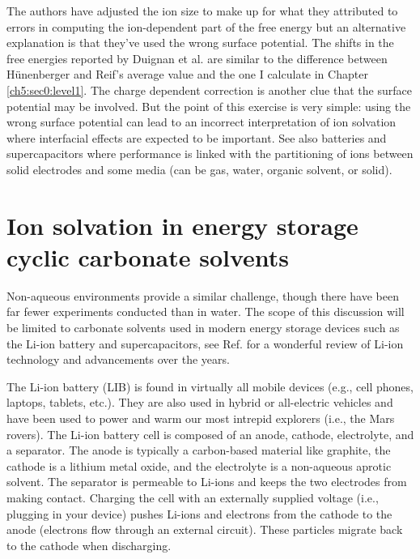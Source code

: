 \begin{intro}
   The authors have adjusted the ion size to make up for what they attributed to errors in computing the ion-dependent part of the free energy but an 
   alternative explanation is that they've used the wrong surface potential. The shifts in the free energies reported by Duignan et al. are similar to the difference
   between H\"{u}nenberger and Reif's average value and the one I calculate in Chapter \ref{ch5:sec0:level1}. The charge dependent correction is another clue
   that the surface potential may be involved. But the point of this exercise is very simple: using the wrong surface potential can lead to an incorrect
   interpretation of ion solvation where interfacial effects are expected to be important. See also batteries and supercapacitors where performance is linked
   with the partitioning of ions between solid electrodes and some media (can be gas, water, organic solvent, or solid)\cite{li2015solid,schutter2015toward}.

  \section{\label{ch1:sec5:level1}Ion solvation in energy storage cyclic carbonate solvents}
   Non-aqueous environments provide a similar challenge, though there have been far fewer experiments conducted than in water. The scope of this discussion will
   be limited to carbonate solvents used in modern energy storage devices such as the Li-ion battery and supercapacitors, see Ref. \cite{goodenough2013li} for a 
   wonderful review of Li-ion technology and advancements over the years. 
   
   The Li-ion battery (LIB) is found in virtually all mobile devices (e.g., cell phones, laptops, tablets, etc.). They are also used in hybrid or all-electric 
   vehicles and have been used to power and warm our most intrepid explorers (i.e., the Mars rovers)\cite{ratnakumar2006li}. The Li-ion battery cell is composed 
   of an anode, cathode, electrolyte, and a separator. The anode is typically a carbon-based material like graphite, the cathode is a lithium metal oxide, and the
   electrolyte is a non-aqueous aprotic solvent\cite{voelker2014trace}. The separator is permeable to Li-ions and keeps the two electrodes from making contact. 
   Charging the cell with an externally supplied voltage (i.e., plugging in your device) pushes Li-ions and electrons from the cathode to the anode (electrons flow
   through an external circuit). These particles migrate back to the cathode when discharging. 
   

\end{intro}
